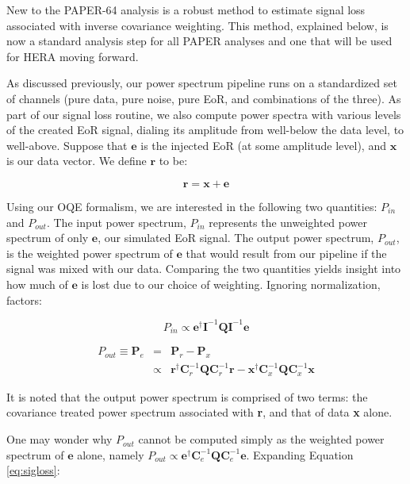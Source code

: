\documentclass[preprint2,numberedappendix,tighten,twocolappendix]{aastex6}  %
\begin{document}
New to the PAPER-64 analysis is a robust method to estimate signal loss associated with inverse covariance weighting. This method, explained below, is now a standard analysis step for all PAPER analyses and one that will be used for HERA moving forward.

As discussed previously, our power spectrum pipeline runs on a standardized set of channels (pure data, pure noise, pure EoR, and combinations of the three). As part of our signal loss routine, we also compute power spectra with various levels of the created EoR signal, dialing its amplitude from well-below the data level, to well-above. Suppose that $\textbf{e}$ is the injected EoR (at some amplitude level), and $\textbf{x}$ is our data vector. We define $\textbf{r}$ to be:

\begin{equation}
\textbf{r} = \textbf{x} + \textbf{e}
\end{equation}

Using our OQE formalism, we are interested in the following two quantities: $P_{in}$ and $P_{out}$. The input power spectrum, $P_{in}$ represents the unweighted power spectrum of only $\textbf{e}$, our simulated EoR signal. The output power spectrum, $P_{out}$, is the weighted power spectrum of $\textbf{e}$ that would result from our pipeline if the signal was mixed with our data. Comparing the two quantities yields insight into how much of $\textbf{e}$ is lost due to our choice of weighting. Ignoring normalization, factors:

\begin{equation}
P_{in} \propto \textbf{e}^{\dagger}\textbf{I}^{-1}\textbf{Q}\textbf{I}^{-1}\textbf{e}
\end{equation}

\begin{eqnarray}
\label{eq:sigloss}
P_{out} \equiv \textbf{P}_{e} &=& \textbf{P}_{r}-\textbf{P}_{x} \nonumber \\
&\propto& \textbf{r}^{\dagger}\textbf{C}_{r}^{-1}\textbf{Q}\textbf{C}_{r}^{-1}\textbf{r} - \textbf{x}^{\dagger}\textbf{C}_{x}^{-1}\textbf{Q}\textbf{C}_{x}^{-1}\textbf{x} 
\end{eqnarray}

It is noted that the output power spectrum is comprised of two terms: the covariance treated power spectrum associated with \textbf{r}, and that of data \textbf{x} alone. 

One may wonder why $P_{out}$ cannot be computed simply as the weighted power spectrum of $\textbf{e}$ alone, namely $P_{out} \propto \textbf{e}^{\dagger}\textbf{C}_{e}^{-1}\textbf{Q}\textbf{C}_{e}^{-1}\textbf{e}$. Expanding Equation \ref{eq:sigloss}:
\end{document}
